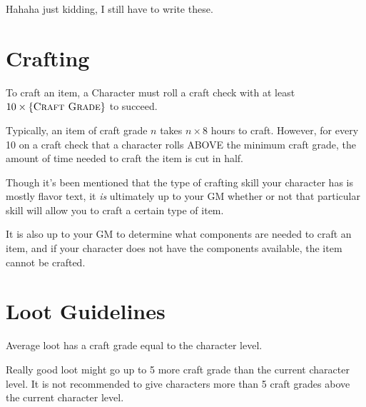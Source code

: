 Hahaha just kidding, I still have to write these.

\section{Crafting}
To craft an item, a Character must roll a craft check with at least $10 \times \{ \textsc{Craft Grade} \}$ to succeed.

Typically, an item of craft grade $n$ takes $n \times 8$ hours to craft. However, for every 10 on a craft check that a character rolls ABOVE the minimum craft grade, the amount of time needed to craft the item is cut in half.

Though it's been mentioned that the type of crafting skill your character has is mostly flavor text, it \emph{is} ultimately up to your GM whether or not that particular skill will allow you to craft a certain type of item.

It is also up to your GM to determine what components are needed to craft an item, and if your character does not have the components available, the item cannot be crafted.

\section{Loot Guidelines}
Average loot has a craft grade equal to the character level.

Really good loot might go up to 5 more craft grade than the current character level. It is not recommended to give characters more than 5 craft grades above the current character level.
